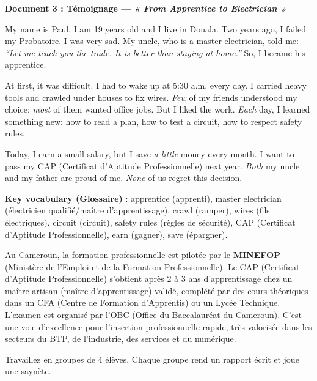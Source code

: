 \documentclass[11pt]{article}
\newcommand{\cle}[1]{{\popxbold\color{popdark}#1}}
\newcounter{popsec}
\newcounter{popsub}
\newcommand{\courssub}[1]{%
  \stepcounter{popsub}%
  \par\vspace{9pt}\noindent{\popxbold\fontsize{11.5}{13}\selectfont\color{popink}{\color{poporange}\thepopsec.\thepopsub}\hspace{6pt}#1}\par\nopagebreak\vspace{4pt}
}
\begin{document}
\textbf{Document 3 : Témoignage — \emph{« From Apprentice to Electrician »}}
\begin{exemplebox}
My name is Paul. I am 19 years old and I live in Douala. Two years ago, I failed my Probatoire. I was very sad. My uncle, who is a master electrician, told me: \emph{``Let me teach you the trade. It is better than staying at home.''} So, I became his apprentice.

At first, it was difficult. I had to wake up at 5:30 a.m. every day. I carried heavy tools and crawled under houses to fix wires. \emph{Few} of my friends understood my choice; \emph{most} of them wanted office jobs. But I liked the work. \emph{Each} day, I learned something new: how to read a plan, how to test a circuit, how to respect safety rules.

Today, I earn a small salary, but I save \emph{a little} money every month. I want to pass my CAP (Certificat d'Aptitude Professionnelle) next year. \emph{Both} my uncle and my father are proud of me. \emph{None} of us regret this decision.

\textbf{Key vocabulary (Glossaire)} : \cle{apprentice} (apprenti), \cle{master electrician} (électricien qualifié/maître d'apprentissage), \cle{crawl} (ramper), \cle{wires} (fils électriques), \cle{circuit} (circuit), \cle{safety rules} (règles de sécurité), \cle{CAP} (Certificat d'Aptitude Professionnelle), \cle{earn} (gagner), \cle{save} (épargner).
\end{exemplebox}

\begin{savaistu}
Au Cameroun, la formation professionnelle est pilotée par le \textbf{MINEFOP} (Ministère de l'Emploi et de la Formation Professionnelle). Le \cle{CAP} (Certificat d'Aptitude Professionnelle) s'obtient après 2 à 3 ans d'apprentissage chez un \cle{maître artisan} (maître d'apprentissage) validé, complété par des cours théoriques dans un \cle{CFA} (Centre de Formation d'Apprentis) ou un \cle{Lycée Technique}. L'examen est organisé par l'\cle{OBC} (Office du Baccalauréat du Cameroun). C'est une voie d'excellence pour l'insertion professionnelle rapide, très valorisée dans les secteurs du BTP, de l'industrie, des services et du numérique.
\end{savaistu}

\courssub{Consignes}
Travaillez en groupes de 4 élèves. Chaque groupe rend un rapport écrit et joue une saynète.
\end{document}
